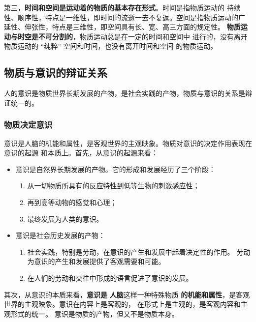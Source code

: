 \documentclass[utf-8, 10pt]{article}
\begin{document}
第三，\textbf{时间和空间是运动着的物质的基本存在形式}。时间是指物质运动的
持续性、顺序性，特点是一维性，即时间的流逝一去不复返。空间是指物质运动的广
延性、伸张性，特点是三维性，即空间具有长、宽、高三方面的规定性。
\textbf{物质运动与时空是不可分割的}，物质运动总是在一定的时间和空间中
进行的，没有离开物质运动的 “纯粹” 空间和时间，也没有离开时间和空间
的物质运动。


\subsection{物质与意识的辩证关系}

人的意识是物质世界长期发展的产物，是社会实践的产物，物质与意识的关系是辩证统一的。

\subsubsection{物质决定意识}

意识是人脑的机能和属性，是客观世界的主观映象。物质对意识的决定作用表现在意识的起源
和本质上。首先，从意识的起源来看：
\begin{itemize}[itemsep=0pt]
    \item 意识是自然界长期发展的产物。它的形成和发展经历了三个阶段：
    \begin{enumerate}[label={$\left.\arabic*\right)$}, itemsep=0pt]
        \item 从一切物质所具有的反应特性到低等生物的刺激感应性；
        \item 再到高等动物的感觉和心理；
        \item 最终发展为人类的意识。
    \end{enumerate}
    \item 意识是社会历史发展的产物：
    \begin{enumerate}[label={$\left.\arabic*\right)$}, itemsep=0pt]
        \item 社会实践，特别是劳动，在意识的产生和发展中起着决定性的作用。
        劳动为意识的产生和发展提供了客观需要和可能。
        \item 在人们的劳动和交往中形成的语言促进了意识的发展。
    \end{enumerate}
\end{itemize}
其次，从意识的本质来看，\textbf{意识是} \textbf{人脑}这样一种特殊物质
\textbf{的机能和属性}，是客观世界的主观映象。意识在内容上是客观的，
在形式上是主观的，是客观内容和主观形式的统一。
意识是物质的产物，但又不是物质本身。
\end{document}
